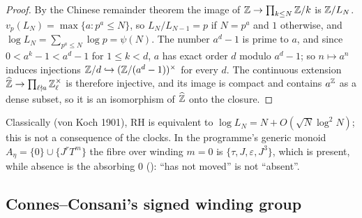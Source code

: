 \begin{proof}
By the Chinese remainder theorem the image of $\mathbb{Z}\to\prod_{k\le N}\mathbb{Z}/k$ is $\mathbb{Z}/L_N$. $v_p(L_N)=\max\{a:p^a\le N\}$, so $L_N/L_{N-1}=p$ if $N=p^a$ and $1$ otherwise, and $\log L_N=\sum_{p^a\le N}\log p=\psi(N)$. The number $a^d-1$ is prime to $a$, and since $0<a^k-1<a^d-1$ for $1\le k<d$, $a$ has exact order $d$ modulo $a^d-1$; so $n\mapsto a^n$ induces injections $\mathbb{Z}/d\hookrightarrow(\mathbb{Z}/(a^d-1))^\times$ for every $d$. The continuous extension $\widehat{\mathbb{Z}}\to\prod_{\ell\nmid a}\mathbb{Z}_\ell^\times$ is therefore injective, and its image is compact and contains $a^{\mathbb{Z}}$ as a dense subset, so it is an isomorphism of $\widehat{\mathbb{Z}}$ onto the closure.
\end{proof}

Classically (von Koch 1901), RH is equivalent to $\log L_N=N+O(\sqrt N\log^2N)$; this is not a consequence of the clocks.
In the programme's generic monoid $A_\eta=\{0\}\cup\{J^rT^m\}$ the fibre over winding $m=0$ is $\{\tau,J,\varepsilon,J^3\}$, which is present, while absence is the absorbing $0$ (): ``has not moved'' is not ``absent''.

\subsection{Connes--Consani's signed winding group}

